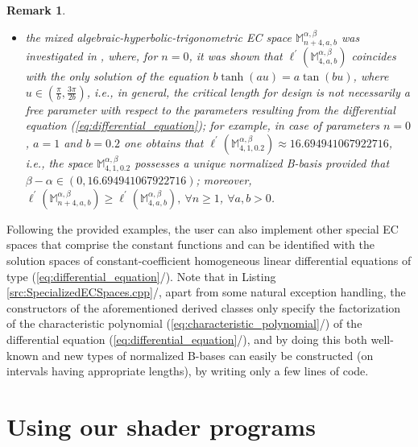 \documentclass[b5paper, twosided]{book}
\newtheorem{remark}{Remark}[chapter]
\DeclareRobustCommand{\mref}[1]{\ref{#1}{\relsize{-1}/\pageref{#1}}}
\begin{document}
\begin{remark}
\begin{itemize}
        \item
        the mixed algebraic-hyperbolic-trigonometric EC space $\mathbb{M}_{n+4,a,b}^{\alpha,\beta}$ was investigated in \citep{BrilleaudMazure2012}, where, for $n=0$, it was shown that $\ell^{\prime}\left(\mathbb{M}_{4,a,b}^{\alpha,\beta}\right)$ coincides with the only solution of the equation $b\tanh\left(au\right)=a \tan\left(bu\right)$, where $u \in \left(\frac{\pi}{b},\frac{3\pi}{2b}\right)$, i.e., in general, the critical length for design is not necessarily a free parameter with respect to the parameters resulting from the differential equation (\ref{eq:differential_equation}); for example, in case of parameters $n=0$, $a=1$ and $b = 0.2$ one obtains that $\ell^{\prime}\left(\mathbb{M}_{4,1,0.2}^{\alpha,\beta}\right)\approx 16.694941067922716$, i.e., the space $\mathbb{M}_{4,1,0.2}^{\alpha,\beta}$ possesses a unique normalized B-basis provided that $\beta - \alpha \in \left(0,16.694941067922716\right)$; moreover, $\ell^{\prime}\left(\mathbb{M}_{n+4,a,b}^{\alpha,\beta}\right)\geq \ell^{\prime}\left(\mathbb{M}_{4,a,b}^{\alpha,\beta}\right),~\forall n\geq 1$, $\forall a,b>0$.
        
    \end{itemize}
    
\end{remark}
Following the provided examples, the user can also implement other special EC spaces that comprise the constant functions and can be identified with the solution spaces of constant-coefficient homogeneous linear differential equations of type (\mref{eq:differential_equation}). Note that in Listing \mref{src:SpecializedECSpaces.cpp}, apart from some natural exception handling, the constructors of the aforementioned derived classes only specify the factorization of the characteristic polynomial (\mref{eq:characteristic_polynomial}) of the differential equation (\mref{eq:differential_equation}), and by doing this both well-known and new types of normalized B-bases can easily be constructed (on intervals having appropriate lengths), by writing only a few lines of code.
 


\section{Using our shader programs}\label{sec:Using_our_shader_programs}
\end{document}
